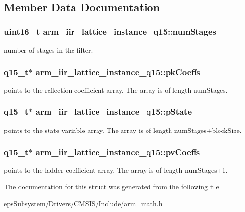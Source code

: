 \subsection{Member Data Documentation}
\hypertarget{structarm__iir__lattice__instance__q15_a96fbed313bef01070409fa182d26ba3f}{
\subsubsection[{num\-Stages}]{\setlength{\rightskip}{0pt plus 5cm}uint16\-\_\-t arm\-\_\-iir\-\_\-lattice\-\_\-instance\-\_\-q15\-::num\-Stages}}\label{structarm__iir__lattice__instance__q15_a96fbed313bef01070409fa182d26ba3f}
number of stages in the filter. \hypertarget{structarm__iir__lattice__instance__q15_a41c214a1ec38d4a82fae8899d715dd29}{
\subsubsection[{pk\-Coeffs}]{\setlength{\rightskip}{0pt plus 5cm}q15\-\_\-t$\ast$ arm\-\_\-iir\-\_\-lattice\-\_\-instance\-\_\-q15\-::pk\-Coeffs}}\label{structarm__iir__lattice__instance__q15_a41c214a1ec38d4a82fae8899d715dd29}
points to the reflection coefficient array. The array is of length num\-Stages. \hypertarget{structarm__iir__lattice__instance__q15_afd0136ab917b529554d93f41a5e04618}{
\subsubsection[{p\-State}]{\setlength{\rightskip}{0pt plus 5cm}q15\-\_\-t$\ast$ arm\-\_\-iir\-\_\-lattice\-\_\-instance\-\_\-q15\-::p\-State}}\label{structarm__iir__lattice__instance__q15_afd0136ab917b529554d93f41a5e04618}
points to the state variable array. The array is of length num\-Stages+block\-Size. \hypertarget{structarm__iir__lattice__instance__q15_a4c4f57f45b223abbe2a9fb727bd2cad9}{
\subsubsection[{pv\-Coeffs}]{\setlength{\rightskip}{0pt plus 5cm}q15\-\_\-t$\ast$ arm\-\_\-iir\-\_\-lattice\-\_\-instance\-\_\-q15\-::pv\-Coeffs}}\label{structarm__iir__lattice__instance__q15_a4c4f57f45b223abbe2a9fb727bd2cad9}
points to the ladder coefficient array. The array is of length num\-Stages+1. 

The documentation for this struct was generated from the following file\-:\begin{DoxyCompactItemize}
\item 
eps\-Subsystem/\-Drivers/\-C\-M\-S\-I\-S/\-Include/arm\-\_\-math.\-h\end{DoxyCompactItemize}
